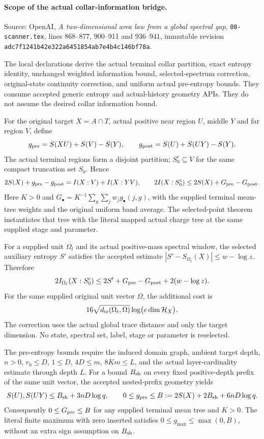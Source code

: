 \paragraph{Scope of the actual collar-information bridge.}
Source: OpenAI, \emph{A two-dimensional area law from a global spectral gap},
\texttt{08-scanner.tex}, lines 868--877, 900--911 and 936--941, immutable revision
\texttt{adc7f1241b42e322a6451854ab7e4b4c146bf78a}.

The local declarations derive the actual terminal collar partition, exact
entropy identity, unchanged weighted information bound, selected-spectrum
correction, original-state continuity correction, and uniform actual
pre-entropy bounds.  They consume accepted generic entropy and actual-history
geometry APIs.  They do not assume the desired collar information bound.

For the original target $X=A\cap T$, actual positive near region $U$, middle
$Y$ and far region $V$, define
\[
  g_{\rm pre}=S(XU)+S(V)-S(Y),\qquad
  g_{\rm post}=S(U)+S(UY)-S(Y).
\]
The actual terminal regions form a disjoint partition; $S_0^c\subseteq V$
for the same compact truncation set $S_0$.  Hence
\[
  2S(X)+g_{\rm pre}-g_{\rm post}=I(X:V)+I(X:YV),
  \qquad 2I(X:S_0^c)\leq2S(X)+G_{\rm pre}-G_{\rm post}.
\]
Here $K>0$ and $G_\bullet=K^{-1}\sum_g\sum_jw_jg_\bullet(j,g)$, with the supplied
terminal mean-tree weights and the original uniform band average.
The selected-point theorem instantiates that tree with the literal mapped
actual charge tree at the same supplied stage and parameter.

For a supplied unit $\Omega_t$ and its actual positive-mass spectral window,
the selected auxiliary entropy $S'$ satisfies the accepted estimate
$|S'-S_{\Omega_t}(X)|\leq w-\log z$.  Therefore
\[
  2I_{\Omega_t}(X:S_0^c)
  \leq2S'+G_{\rm pre}-G_{\rm post}+2(w-\log z).
\]
For the same supplied original unit vector $\Omega$, the additional cost is
\[
  16\sqrt{d_{\rm tr}(\Omega_t,\Omega)}
  \log\bigl(e\dim\mathcal H_X\bigr).
\]
The correction uses the actual global trace distance and only the target
dimension.  No state, spectral set, label, stage or parameter is reselected.

The pre-entropy bounds require the induced domain graph, ambient target
depth, $n>0$, $r_0\leq D$, $1\leq D$, $4D\leq m$, $8Km\leq L$, and the
actual layer-cardinality estimate through depth $L$.  For a bound
$B_{\rm sh}$ on every fixed positive-depth prefix of the same unit vector,
the accepted nested-prefix geometry yields
\[
  S(U),S(UY)\leq B_{\rm sh}+3nD\log q,
  \qquad 0\leq g_{\rm pre}\leq B:=2S(X)+2B_{\rm sh}+6nD\log q.
\]
Consequently $0\leq G_{\rm pre}\leq B$ for any supplied terminal mean tree
and $K>0$.  The literal finite maximum with zero inserted satisfies
$0\leq g_{\max}\leq\max(0,B)$, without an extra sign assumption on
$B_{\rm sh}$.

